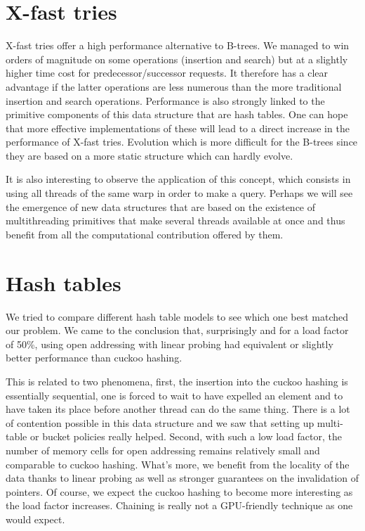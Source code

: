 \section{X-fast tries}

X-fast tries offer a high performance alternative to B-trees. We managed to win orders of magnitude on some operations (insertion and search) but at a slightly higher time cost for predecessor/successor requests. It therefore has a clear advantage if the latter operations are less numerous than the more traditional insertion and search operations. Performance is also strongly linked to the primitive components of this data structure that are hash tables. One can hope that more effective implementations of these will lead to a direct increase in the performance of X-fast tries. Evolution which is more difficult for the B-trees since they are based on a more static structure which can hardly evolve.

It is also interesting to observe the application of this concept, which consists in using all threads of the same warp in order to make a query. Perhaps we will see the emergence of new data structures that are based on the existence of multithreading primitives that make several threads available at once and thus benefit from all the computational contribution offered by them.

\section{Hash tables}

We tried to compare different hash table models to see which one best matched our problem. We came to the conclusion that, surprisingly and for a load factor of 50\%, using open addressing with linear probing had equivalent or slightly better performance than cuckoo hashing.

This is related to two phenomena, first, the insertion into the cuckoo hashing is essentially sequential, one is forced to wait to have expelled an element and to have taken its place before another thread can do the same thing. There is a lot of contention possible in this data structure and we saw that setting up multi-table or bucket policies really helped. Second, with such a low load factor, the number of memory cells for open addressing remains relatively small and comparable to cuckoo hashing. What's more, we benefit from the locality of the data thanks to linear probing as well as stronger guarantees on the invalidation of pointers. Of course, we expect the cuckoo hashing to become more interesting as the load factor increases. Chaining is really not a GPU-friendly technique as one would expect.


